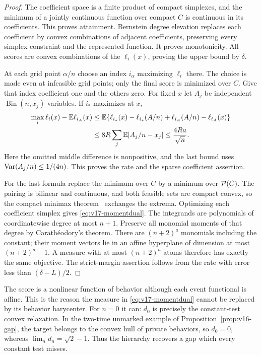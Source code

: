 \begin{proof}
The coefficient space is a finite product of compact simplexes, and
the minimum of a jointly continuous function over compact $C$ is
continuous in its coefficients. This proves attainment. Bernstein
degree elevation replaces each coefficient by convex combinations
of adjacent coefficients, preserving every simplex constraint and the
represented function. It proves monotonicity. All scores are convex
combinations of the $\ell_i(x)$, proving the upper bound by $\delta$.

At each grid point $\alpha/n$ choose an index $i_\alpha$ maximizing
$\ell_i$ there. The choice is made even at infeasible grid points; only
the final score is minimized over $C$. Give that index coefficient one
and the others zero. For fixed $x$ let $A_j$ be independent
$\operatorname{Bin}(n,x_j)$ variables. If $i_*$ maximizes at $x$,
\begin{align*}
 \max_i\ell_i(x)-\mathbb E\ell_{i_A}(x)
 &\le\mathbb E\{\ell_{i_*}(x)-\ell_{i_*}(A/n)
             +\ell_{i_A}(A/n)-\ell_{i_A}(x)\}\\
 &\le8R\sum_j\mathbb E|A_j/n-x_j|
 \le \frac{4Ra}{\sqrt n}.
\end{align*}
Here the omitted middle difference is nonpositive, and the last bound
uses $\operatorname{Var}(A_j/n)\le1/(4n)$. This proves the rate and the sparse
coefficient assertion.

For the last formula replace the minimum over $C$ by a minimum over
$\mathcal P(C)$. The pairing is bilinear and continuous, and both feasible
sets are compact convex, so the compact minimax theorem~\cite{Sion1958} exchanges the extrema. Optimizing each coefficient
simplex gives \eqref{eq:v17-momentdual}. The integrands are polynomials
of coordinatewise degree at most $n+1$. Preserve all monomial moments
of that degree by Carath\'eodory's theorem. There are $(n+2)^a$
monomials including the constant; their moment vectors lie in an
affine hyperplane of dimension at most $(n+2)^a-1$. A measure with at
most $(n+2)^a$ atoms therefore has exactly the same objective. The
strict-margin assertion follows from the rate with error less than
$(\delta-L)/2$.
\end{proof}

The score is a nonlinear function of behavior although each event
functional is affine. This is the reason the measure in
\eqref{eq:v17-momentdual} cannot be replaced by its behavior barycenter.
For $n=0$ it can: $d_0$ is precisely the constant-test convex
relaxation. In the two-time unmarked example of
Proposition~\ref{prop:v16-gap}, the target belongs to the convex
hull of private behaviors, so $d_0=0$, whereas
$\lim_n d_n=\sqrt2-1$. Thus the hierarchy recovers a gap which every
constant test misses.

